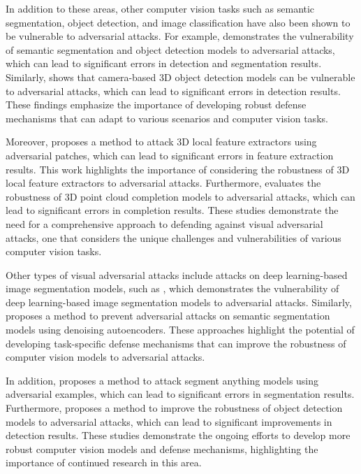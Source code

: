 \documentclass[11pt]{article}
\begin{document}
In addition to these areas, other computer vision tasks such as semantic segmentation, object detection, and image classification have also been shown to be vulnerable to adversarial attacks. For example, \cite{ref27} demonstrates the vulnerability of semantic segmentation and object detection models to adversarial attacks, which can lead to significant errors in detection and segmentation results. Similarly, \cite{ref89} shows that camera-based 3D object detection models can be vulnerable to adversarial attacks, which can lead to significant errors in detection results. These findings emphasize the importance of developing robust defense mechanisms that can adapt to various scenarios and computer vision tasks.

Moreover, \cite{ref13} proposes a method to attack 3D local feature extractors using adversarial patches, which can lead to significant errors in feature extraction results. This work highlights the importance of considering the robustness of 3D local feature extractors to adversarial attacks. Furthermore, \cite{ref90} evaluates the robustness of 3D point cloud completion models to adversarial attacks, which can lead to significant errors in completion results. These studies demonstrate the need for a comprehensive approach to defending against visual adversarial attacks, one that considers the unique challenges and vulnerabilities of various computer vision tasks.

Other types of visual adversarial attacks include attacks on deep learning-based image segmentation models, such as \cite{ref91}, which demonstrates the vulnerability of deep learning-based image segmentation models to adversarial attacks. Similarly, \cite{ref92} proposes a method to prevent adversarial attacks on semantic segmentation models using denoising autoencoders. These approaches highlight the potential of developing task-specific defense mechanisms that can improve the robustness of computer vision models to adversarial attacks.

In addition, \cite{ref93} proposes a method to attack segment anything models using adversarial examples, which can lead to significant errors in segmentation results. Furthermore, \cite{ref94} proposes a method to improve the robustness of object detection models to adversarial attacks, which can lead to significant improvements in detection results. These studies demonstrate the ongoing efforts to develop more robust computer vision models and defense mechanisms, highlighting the importance of continued research in this area.
\end{document}
